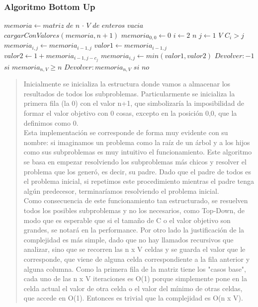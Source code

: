 \documentclass[8pt,a4paper]{article}
\begin{document}
\begin{verse}
\end{verse}

\subsubsection{Algoritmo Bottom Up}
\begin{codebox}
\li $memoria \gets matriz$ $de$ $n$ $\cdot$ $V$ $de$ $enteros$ $vacia$
\li $cargarConValores(memoria,n+1)$
\li $memoria_{0,0} \gets 0$
\li \For $i \gets 2$ \To $n$
\li	 	\For $j \gets 1$ \To $V$
\li 		\If $C_{i} > j$ \Then
\li 			$memoria_{i,j} \gets memoria_{i-1,j}$
\li 	\Else
\li 			$valor1 \gets memoria_{i-1,j}$
\li 			$valor2 \gets 1 + memoria_{i-1,j-c_{j}} $
\li 			$memoria_{i,j} \gets min(valor1,valor2)$ 
		\End	
	\End  
\End
\li $Devolver: -1$  $si$ $memoria_{n,V} \geq n$
\li $Devolver: memoria_{n,V}$ $si$ $no$

\end{codebox}
\begin{verse} 
Inicialmente se inicializa la estructura donde vamos a almacenar los resultados de todos los subproblemas. Particularmente se inicializa la primera fila (la 0) con el valor n+1, que simbolizaría la imposibilidad de formar el valor objetivo con 0 cosas, excepto en la posición 0,0, que la definimos como 0.\\
Esta implementación se corresponde de forma muy evidente con su nombre: si imaginamos un problema como la raíz de un árbol y a los hijos como sus subproblemas es muy intuitivo el funcionamiento. Este algoritmo se basa en empezar resolviendo los subproblemas más chicos y resolver el problema que los generó, es decir, su padre. Dado que el padre de todos es el problema inicial, si repetimos este procedimiento mientras el padre tenga algún predecesor, terminaríamos resolviendo el problema inicial.\\
Como consecuencia de este funcionamiento tan estructurado, se resuelven todos los posibles subproblemas y no los necesarios, como Top-Down, de modo que es esperable que si el tamaño de C o el valor objetivo son grandes, se notará en la performance. Por otro lado la justificación de la complejidad es más simple, dado que no hay llamados recursivos que analizar, sino que se recorren las n x V celdas y se guarda el valor que le corresponde, que viene de alguna celda correspondiente a la fila anterior y alguna columna. Como la primera fila de la matriz tiene los "casos base", cada uno de las n x V iteraciones es O(1) porque simplemente pone en la celda actual el valor de otra celda o el valor del mínimo de otras celdas, que accede en O(1). Entonces es trivial que la complejidad es O(n x V).
\end{verse}
\end{document}
